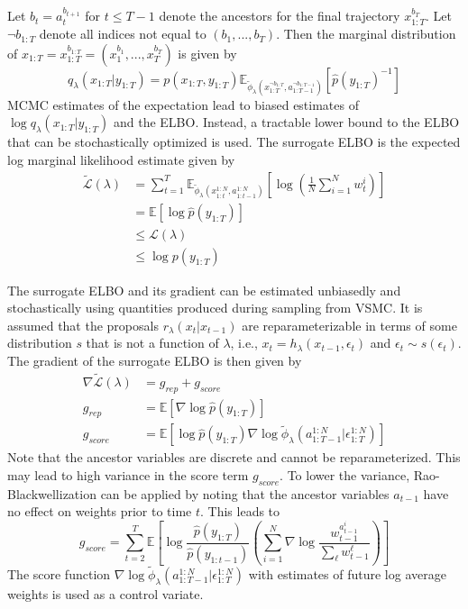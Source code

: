 \documentclass{article}
\begin{document}
Let $b_t=a_t^{b_{t+1}}$ for $t\leq T-1$ denote the ancestors for the final trajectory $x_{1:T}^{b_T}$. Let $\neg b_{1:T}$ denote all indices not equal to $(b_1,...,b_T)$. Then the marginal distribution of $x_{1:T}=x_{1:T}^{b_{1:T}}=(x_1^{b_1},...,x_T^{b_T})$ is given by
\[
q_\lambda(x_{1:T}|y_{1:T}) = p(x_{1:T},y_{1:T})\mathbb{E}_{\tilde{\phi}_\lambda(x_{1:T}^{\neg b_{1:T}},a_{1:T-1}^{\neg b_{1:T-1}})}\left[\hat{p}(y_{1:T})^{-1}\right]
\]
MCMC estimates of the expectation lead to biased estimates of $\log q_\lambda(x_{1:T}|y_{1:T})$ and the ELBO. Instead, a tractable lower bound to the ELBO that can be stochastically optimized is used. The surrogate ELBO is the expected log marginal likelihood estimate given by
\begin{align*}
\tilde{\mathcal{L}}(\lambda) &= \sum_{t=1}^T\mathbb{E}_{\tilde{\phi}_\lambda(x_{1:t}^{1:N},a_{1:t-1}^{1:N})}\left[\log\left(\frac{1}{N}\sum_{i=1}^Nw_t^i\right)\right] \\
&= \mathbb{E}[\log\hat{p}(y_{1:T})] \\
&\leq \mathcal{L}(\lambda) \\
&\leq \log p(y_{1:T})
\end{align*}

The surrogate ELBO and its gradient can be estimated unbiasedly and stochastically using quantities produced during sampling from VSMC. It is assumed that the proposals $r_\lambda(x_t|x_{t-1})$ are reparameterizable in terms of some distribution $s$ that is not a function of $\lambda$, i.e., $x_t=h_\lambda(x_{t-1},\epsilon_t)$ and $\epsilon_t\sim s(\epsilon_t)$. The gradient of the surrogate ELBO is then given by
\begin{align*}
\nabla \tilde{\mathcal{L}}(\lambda) &= g_{rep} + g_{score} \\
g_{rep} &= \mathbb{E}[\nabla\log\hat{p}(y_{1:T})] \\
g_{score} &= \mathbb{E}\left[\log\hat{p}(y_{1:T})\nabla\log\tilde{\phi}_\lambda(a_{1:T-1}^{1:N}|\epsilon_{1:T}^{1:N})\right]
\end{align*}
Note that the ancestor variables are discrete and cannot be reparameterized. This may lead to high variance in the score term $g_{score}$. To lower the variance, Rao-Blackwellization \parencite{Robert:2021} can be applied by noting that the ancestor variables $a_{t-1}$ have no effect on weights prior to time $t$. This leads to
\[
g_{score} = \sum_{t=2}^T\mathbb{E}\left[\log \frac{\hat{p}(y_{1:T})}{\hat{p}(y_{1:t-1})}\left(\sum_{i=1}^N\nabla\log \frac{w_{t-1}^{a_{t-1}^i}}{\sum_\ell w_{t-1}^\ell}\right)\right]
\]
The score function $\nabla\log\tilde{\phi}_\lambda(a_{1:T-1}^{1:N}|\epsilon_{1:T}^{1:N})$ with estimates of future log average weights is used as a control variate.
\\
\end{document}
